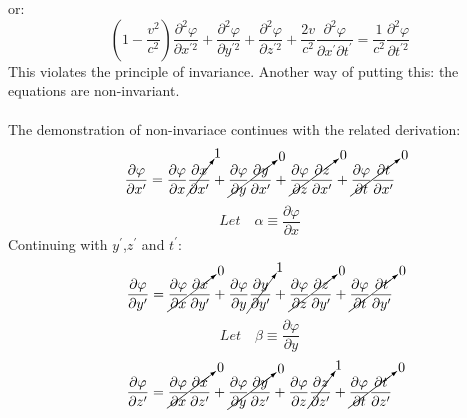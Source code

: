 \documentclass[journal]{IEEEtran}
\begin{document}
or:
\begin{equation}
\boxed{
\left(1 - \frac{v^2}{c^2}\right)
\frac{\partial^2\varphi}{\partial x^{\prime2}} +
\frac{\partial^2\varphi}{\partial y^{\prime2}} +
\frac{\partial^2\varphi}{\partial z^{\prime2}}  +
\frac{2v}{c^2}
\frac{\partial^2\varphi}{\partial x^\prime\partial t^\prime} =
\frac{1}{c^2}\frac{\partial^2\varphi}{\partial t^{\prime2}}
}
\end{equation}
This violates the principle of invariance.  Another way of putting
this:  the equations are non-invariant.\\\\The demonstration of
non-invariace continues with the related derivation:
\begin{equation}
\frac{\partial\varphi}{\partial x^{\prime}} =
\frac{\partial\varphi}{\partial x}\cancelto{1}
{\frac{\partial x}{\partial x^\prime}} +
\cancelto{0}{\frac{\partial\varphi}{\partial y}
\frac{\partial y}{\partial x^\prime}} +
\cancelto{0}{\frac{\partial\varphi}{\partial z}
\frac{\partial z}{\partial x^\prime}} +
\cancelto{0}{\frac{\partial\varphi}{\partial t}
\frac{\partial t}{\partial x^\prime}}
\end{equation}
\begin{equation}
\boxed{
Let\quad\alpha\equiv\frac{\partial\varphi}{\partial x} 
}
\end{equation}
Continuing with $y^\prime$,$z^\prime$ and $t^\prime$:\\
\begin{equation}
\frac{\partial\varphi}{\partial y^{\prime}} =
\cancelto{0}{\frac{\partial\varphi}{\partial x}\frac{\partial x}
{\partial y^\prime}} +
\frac{\partial\varphi}{\partial y}\cancelto{1}{\frac{\partial y}
{\partial y^{\prime}}} +
\cancelto{0}{\frac{\partial\varphi}{\partial z}\frac{\partial z}
{\partial y^{\prime}}} +
\cancelto{0}{\frac{\partial\varphi}{\partial t}\frac{\partial t}
{\partial y^{\prime}}}
\end{equation}
\begin{equation}
\boxed{
Let\quad\beta\equiv\frac{\partial\varphi}{\partial y}
}
\end{equation}
\begin{equation}
\frac{\partial\varphi}{\partial z^{\prime}} =
\cancelto{0}{\frac{\partial\varphi}{\partial x}\frac{\partial x}
{\partial z^\prime}} +
\cancelto{0}{\frac{\partial\varphi}{\partial y}\frac{\partial y}
{\partial z^{\prime}}} +
\frac{\partial\varphi}{\partial z}\cancelto{1}{\frac{\partial z}
{\partial z^{\prime}}} +
\cancelto{0}{\frac{\partial\varphi}{\partial t}\frac{\partial t}
{\partial z^{\prime}}}
\end{equation}
\end{document}
